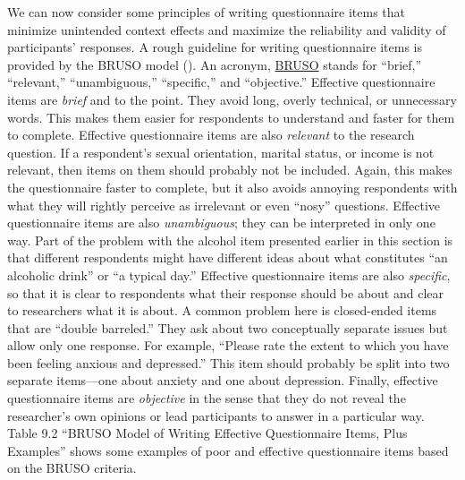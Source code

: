 \documentclass[
]{krantz}
\begin{document}
We can now consider some principles of writing questionnaire items that minimize unintended context effects and maximize the reliability and validity of participants' responses. A rough guideline for writing questionnaire items is provided by the BRUSO model (). An acronym, \hyperref[bruso]{BRUSO} stands for ``brief,'' ``relevant,'' ``unambiguous,'' ``specific,'' and ``objective.'' Effective questionnaire items are \emph{brief} and to the point. They avoid long, overly technical, or unnecessary words. This makes them easier for respondents to understand and faster for them to complete. Effective questionnaire items are also \emph{relevant} to the research question. If a respondent's sexual orientation, marital status, or income is not relevant, then items on them should probably not be included. Again, this makes the questionnaire faster to complete, but it also avoids annoying respondents with what they will rightly perceive as irrelevant or even ``nosy'' questions. Effective questionnaire items are also \emph{unambiguous}; they can be interpreted in only one way. Part of the problem with the alcohol item presented earlier in this section is that different respondents might have different ideas about what constitutes ``an alcoholic drink'' or ``a typical day.'' Effective questionnaire items are also \emph{specific}, so that it is clear to respondents what their response should be about and clear to researchers what it is about. A common problem here is closed-ended items that are ``double barreled.'' They ask about two conceptually separate issues but allow only one response. For example, ``Please rate the extent to which you have been feeling anxious and depressed.'' This item should probably be split into two separate items---one about anxiety and one about depression. Finally, effective questionnaire items are \emph{objective} in the sense that they do not reveal the researcher's own opinions or lead participants to answer in a particular way. Table 9.2 ``BRUSO Model of Writing Effective Questionnaire Items, Plus Examples'' shows some examples of poor and effective questionnaire items based on the BRUSO criteria.
\end{document}

